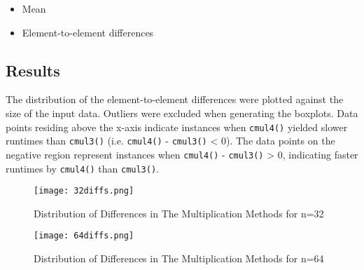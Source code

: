 \documentclass[usletter, 12pt]{article}
\begin{document}
        \begin{itemize}

            \item Mean
            \item Element-to-element differences

        \end{itemize}

        \subsection{Results}
        The distribution of the element-to-element differences were plotted against the size of the input data. Outliers were excluded when generating the boxplots. Data points residing above the x-axis indicate instances when \texttt{cmul4()} yielded slower runtimes than \texttt{cmul3()} (i.e. \texttt{cmul4()} - \texttt{cmul3()} < 0). The data points on the negative region represent instances when \texttt{cmul4()} - \texttt{cmul3()} > 0, indicating faster runtimes by \texttt{cmul4()} than \texttt{cmul3()}.

        \begin{figure}[ht]
            \begin{center}
                \texttt{[image: 32diffs.png]}
                \caption{Distribution of Differences in The Multiplication Methods for n=32} \label{32diffs}
            \end{center}
        \end{figure}

        \begin{figure}[ht]
            \begin{center}
                \texttt{[image: 64diffs.png]}
                \caption{Distribution of Differences in The Multiplication Methods for n=64} \label{64diffs}
            \end{center}
        \end{figure}
\end{document}
